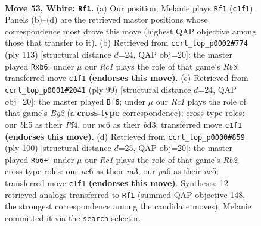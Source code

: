\documentclass[11pt]{article}
\begin{document}
\clearpage

\begin{figure}[p]\centering
\begin{subfigure}{0.46\textwidth}\centering
\resizebox{\linewidth}{!}{%
\newchessgame
\chessboard[
  setfen={2k5/3r4/p1n2P2/7b/1P6/2B5/P6K/2R5 w - - 11 53},
  showmover=false,
  pgfstyle=straightmove, color=movearrow, markmove={c1-f1}
]}
\caption{}
\end{subfigure}\hfill
\begin{subfigure}{0.46\textwidth}\centering
\resizebox{\linewidth}{!}{%
\newchessgame
\chessboard[
  setfen={3k4/6R1/1P2p2p/3bP3/3N4/2K5/8/1r6 b - - 0 57},
  showmover=false,
  pgfstyle=straightmove, color=movearrow, markmove={b1-b6}
]}
\caption{}
\end{subfigure}
\\[4pt]
\begin{subfigure}{0.46\textwidth}\centering
\resizebox{\linewidth}{!}{%
\newchessgame
\chessboard[
  setfen={R7/6b1/4P2k/1p6/3p1p2/P2B4/1r6/4K3 b - - 0 50},
  showmover=false,
  pgfstyle=straightmove, color=movearrow, markmove={g7-f6}
]}
\caption{}
\end{subfigure}\hfill
\begin{subfigure}{0.46\textwidth}\centering
\resizebox{\linewidth}{!}{%
\newchessgame
\chessboard[
  setfen={8/8/4k3/4np2/8/r1P3P1/1R2K3/4B3 w - - 2 51},
  showmover=false,
  pgfstyle=straightmove, color=movearrow, markmove={b2-b6}
]}
\caption{}
\end{subfigure}
\caption{\textbf{Move 53, White: \texttt{Rf1}.} (a) Our position; Melanie plays \texttt{Rf1} (\texttt{c1f1}). Panels (b)--(d) are the retrieved master positions whose correspondence most drove this move (highest QAP objective among those that transfer to it). (b) Retrieved from \texttt{ccrl\_top\_p0002\#774} (ply 113) [structural distance $d$=24, QAP obj=20]: the master played \texttt{Rxb6}; under $\mu$ our \emph{Rc1} plays the role of that game's \emph{Rb8}; transferred move \texttt{c1f1} \textbf{(endorses this move)}. (c) Retrieved from \texttt{ccrl\_top\_p0001\#2041} (ply 99) [structural distance $d$=24, QAP obj=20]: the master played \texttt{Bf6}; under $\mu$ our \emph{Rc1} plays the role of that game's \emph{Bg2} (a \textbf{cross-type} correspondence); cross-type roles: our \emph{b}h5 as their \emph{P}f4, our \emph{n}c6 as their \emph{b}d3; transferred move \texttt{c1f1} \textbf{(endorses this move)}. (d) Retrieved from \texttt{ccrl\_top\_p0000\#859} (ply 100) [structural distance $d$=25, QAP obj=20]: the master played \texttt{Rb6+}; under $\mu$ our \emph{Rc1} plays the role of that game's \emph{Rb2}; cross-type roles: our \emph{n}c6 as their \emph{r}a3, our \emph{p}a6 as their \emph{n}e5; transferred move \texttt{c1f1} \textbf{(endorses this move)}. Synthesis: 12 retrieved analogs transferred to \texttt{Rf1} (summed QAP objective 148, the strongest correspondence among the candidate moves); Melanie committed it via the \texttt{search} selector.}
\label{fig:thought-m104}
\end{figure}
\end{document}
